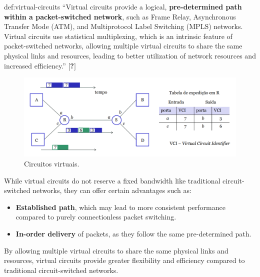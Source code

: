 \begin{theo}{def:virtual-circuits}\label{def:virtual-circuits}
    ``Virtual circuits provide a logical, \textbf{pre-determined path within a packet-switched network}, such as Frame Relay, Asynchronous Transfer Mode (ATM), and Multiprotocol Label Switching (MPLS) networks. Virtual circuits use statistical multiplexing, which is an intrinsic feature of packet-switched networks, allowing multiple virtual circuits to share the same physical links and resources, leading to better utilization of network resources and increased efficiency.'' $[$\textbf{?}$]$
\end{theo}

\vspace{-1em}
\begin{figure}[H]
    \centering
    \includegraphics[width = 0.9\linewidth]{img/1/virtual-circuits.png}
    \caption{Circuitos virtuais.\protect\cite{slidesSobrinho}}
    \label{fig:virtual-circuits}
\end{figure}

\noindent While virtual circuits do not reserve a fixed bandwidth like traditional circuit-switched networks, they can offer certain advantages such as:
\begin{itemize}[label=$\blacktriangle$]
    \item \textbf{Established path}, which may lead to more consistent performance compared to purely connectionless packet switching.
    \item \textbf{In-order delivery} of packets, as they follow the same pre-determined path.
\end{itemize}

\noindent By allowing multiple virtual circuits to share the same physical links and resources, virtual circuits provide greater flexibility and efficiency compared to traditional circuit-switched networks.